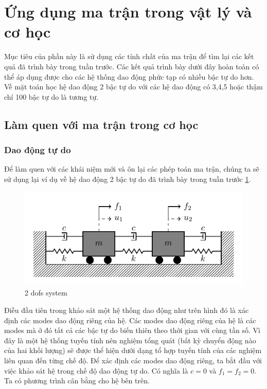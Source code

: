 \section{Ứng dụng ma trận trong vật lý và cơ học}\label{sec_1}

Mục tiêu của phần này là sử dụng các tính chất của ma trận để tìm lại các kết quả đã trình bày trong tuần trước. Các kết quả trình bày dưới đây hoàn toàn có thể áp dụng được cho các hệ thống dao động phức tạp có nhiều bậc tự do hơn. Về mặt toán học hệ dao động 2 bậc tự do với các hệ dao động có 3,4,5 hoặc thậm chí 100 bậc tự do là tương tự.

\subsection{Làm quen với ma trận trong cơ học}
\subsubsection{Dao động tự do}

Để làm quen với các khái niệm mới và ôn lại các phép toán ma trận, chúng ta sẽ sử dụng lại ví dụ về hệ dao động 2 bậc tự do đã trình bày trong tuần trước \cref{fig_2dofs}.

\begin{figure}[htbp]
    \centering
    \includegraphics[width=1.\textwidth]{Tuan6/figure/mass_spring_damper_2dofs.pdf}
    \caption{2 dofs system}
    \label{fig_2dofs}
\end{figure}

Điều đầu tiên trong khảo sát một hệ thống dao động như trên hình đó là xác định các modes dao động riêng của hệ. Các modes dao động riêng của hệ là các modes mà ở đó tất cả các bậc tự do biến thiên theo thời gian với cùng tần số. Vì đây là một hệ thống tuyến tính nên nghiệm tổng quát (bất kỳ chuyển động nào của hai khối lượng) sẽ được thể hiện dưới dạng tổ hợp tuyến tính của các nghiệm liên quan đến từng chế độ. Để xác định các modes dao động riêng, ta bắt đầu với việc khảo sát hệ trong chế độ dao động tự do. Có nghĩa là $c=0$ và $f_1=f_2=0$. Ta có phương trình cân bằng cho hệ bên trên.


